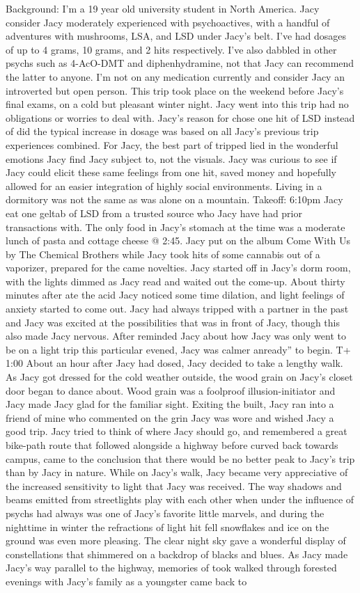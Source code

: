 \documentclass[12pt]{book}
\begin{document}
Background: I'm a 19 year old university student in North America. Jacy consider Jacy moderately experienced with psychoactives, with a handful of adventures with mushrooms, LSA, and LSD under Jacy's belt. I've had dosages of up to 4 grams, 10 grams, and 2 hits respectively. I've also dabbled in other psychs such as 4-AcO-DMT and diphenhydramine, not that Jacy can recommend the latter to anyone. I'm not on any medication currently and consider Jacy an introverted but open person. This trip took place on the weekend before Jacy's final exams, on a cold but pleasant winter night. Jacy went into this trip had no obligations or worries to deal with. Jacy's reason for chose one hit of LSD instead of did the typical increase in dosage was based on all Jacy's previous trip experiences combined. For Jacy, the best part of tripped lied in the wonderful emotions Jacy find Jacy subject to, not the visuals. Jacy was curious to see if Jacy could elicit these same feelings from one hit, saved money and hopefully allowed for an easier integration of highly social environments. Living in a dormitory was not the same as was alone on a mountain. Takeoff: 6:10pm Jacy eat one geltab of LSD from a trusted source who Jacy have had prior transactions with. The only food in Jacy's stomach at the time was a moderate lunch of pasta and cottage cheese @ 2:45. Jacy put on the album Come With Us by The Chemical Brothers while Jacy took hits of some cannabis out of a vaporizer, prepared for the came novelties. Jacy started off in Jacy's dorm room, with the lights dimmed as Jacy read and waited out the come-up. About thirty minutes after ate the acid Jacy noticed some time dilation, and light feelings of anxiety started to come out. Jacy had always tripped with a partner in the past and Jacy was excited at the possibilities that was in front of Jacy, though this also made Jacy nervous. After reminded Jacy about how Jacy was only went to be on a light trip this particular evened, Jacy was calmer anready'' to begin. T+ 1:00 About an hour after Jacy had dosed, Jacy decided to take a lengthy walk. As Jacy got dressed for the cold weather outside, the wood grain on Jacy's closet door began to dance about. Wood grain was a foolproof illusion-initiator and Jacy made Jacy glad for the familiar sight. Exiting the built, Jacy ran into a friend of mine who commented on the grin Jacy was wore and wished Jacy a good trip. Jacy tried to think of where Jacy should go, and remembered a great bike-path route that followed alongside a highway before curved back towards campus, came to the conclusion that there would be no better peak to Jacy's trip than by Jacy in nature. While on Jacy's walk, Jacy became very appreciative of the increased sensitivity to light that Jacy was received. The way shadows and beams emitted from streetlights play with each other when under the influence of psychs had always was one of Jacy's favorite little marvels, and during the nighttime in winter the refractions of light hit fell snowflakes and ice on the ground was even more pleasing. The clear night sky gave a wonderful display of constellations that shimmered on a backdrop of blacks and blues. As Jacy made Jacy's way parallel to the highway, memories of took walked through forested evenings with Jacy's family as a youngster came back to 
\end{document}
